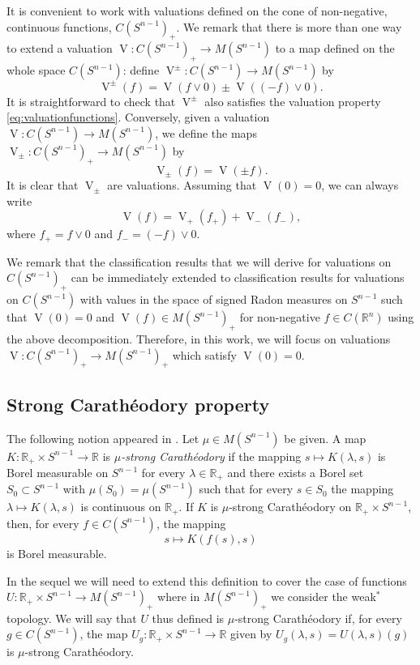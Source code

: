 \documentclass[11pt, a4paper]{amsart}
\newcommand{\rp}{\mathbb R_{\scriptscriptstyle +}}
\newcommand{\sn}{{S^{n-1}}}
\newcommand{\oV}{\operatorname{V}}
\newcommand{\measn}{M(\sn )_{\scriptscriptstyle +}}
\newcommand{\cfn}{C(\sn )_{\scriptscriptstyle +}}
\newcommand{\R}{\mathbb R}
\newcommand{\rn}{\mathbb R^n}
\begin{document}
It is convenient to work with valuations defined on the cone of non-negative, continuous functions, $\cfn$. We remark that there is more than one way to extend a valuation $\oV\colon \cfn\to M(\sn )$ to a map defined on the whole space $C(\sn )$: define $\oV^\pm\colon C(\sn )\to M(\sn )$ by 
$$\oV^\pm(f)=\oV(f\vee 0)\pm \oV((-f)\vee 0).$$
It is straightforward to check that $\oV^\pm$ also satisfies the valuation property \eqref{eq:valuationfunctions}. Conversely, given a valuation  $\oV\colon C(\sn )\to M(\sn )$, we define the maps $\oV_\pm\colon\cfn\to M(\sn )$  by $$\oV_\pm(f)=\oV(\pm f).$$
It is clear that $\oV_\pm$ are valuations. Assuming that $\oV(0)=0$, we can always write
\begin{equation}\label{e:decomp}
\oV(f)=\oV_+(f_{\scriptscriptstyle +})+\oV_-(f_{\scriptscriptstyle-}),
\end{equation}
where $f_{\scriptscriptstyle +}=f\vee 0$ and $f_{\scriptscriptstyle-}=(-f)\vee0$.

We remark that the classification results that we will derive for valuations on $\cfn$ can be immediately extended to classification results for  valuations on $C(\sn)$ with values in the space of signed Radon measures on $\sn$ such that $\oV(0)=0$ and $\oV(f)\in\measn$ for non-negative $f\in C(\rn)$ using the above decomposition. Therefore, in this work, we will focus on valuations $\oV:C(\sn)_{\scriptscriptstyle +}\to M(\sn)_{\scriptscriptstyle +}$ which satisfy $\oV(0)=0$.



\subsection{Strong Carath\'eodory property}\label{ss:SC} The following notion appeared in \cite{DrewOrlicz}. Let $\mu\in M(\sn)$ be given. A map
$K\colon \rp \times \sn  \to \R$ is \emph{$\mu$-strong Carath\'eodory} if the mapping $s\mapsto K(\lambda, s)$ is Borel measurable on $\sn$ for every $\lambda \in\rp$ and there exists a Borel set $S_0\subset\sn$ with $\mu(S_0)=\mu(\sn)$ such that for every $s\in S_0$ the mapping $\lambda\mapsto K(\lambda,s)$ is continuous on $\rp$. If $K$ is $\mu$-strong Carath\'eodory on $ \rp \times \sn$, then, for every $f\in C(\sn)$, the mapping
\[
    s \mapsto K(f(s), s)
\]
is Borel measurable. 

In the sequel we will need to extend this definition to cover the case of functions $U:\rp\times \sn\to M(\sn)_+$ where in $M(\sn)_+$ we consider the weak$^*$ topology. We will say that $U$ thus defined is $\mu$-strong Carath\'eodory if, for every $g\in C(\sn)$, the map $U_g \colon \rp \times \sn  \to \R$ given by $U_g(\lambda, s) = U(\lambda, s)(g)$ is $\mu$-strong Carath\'eodory.
\end{document}
